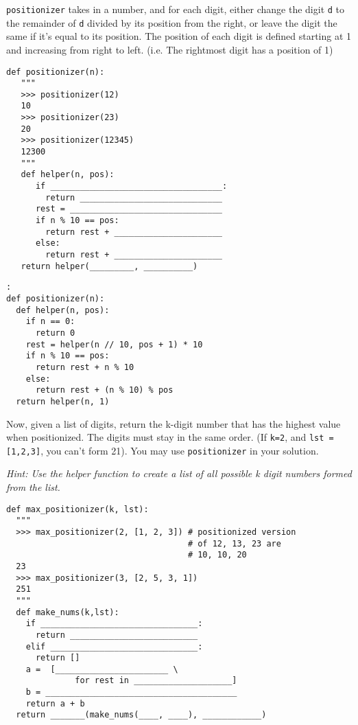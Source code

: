 \begin{blocksection}
\question \lstinline{positionizer} takes in a number, and for each digit, either change the digit \lstinline{d} to the remainder of \lstinline{d} divided by its position from the right, or leave the digit the same if it's equal to its position. The position of each digit is defined starting at 1 and increasing from right to left. (i.e. The rightmost digit has a position of 1)

\begin{lstlisting}
def positionizer(n):
   """
   >>> positionizer(12)
   10
   >>> positionizer(23)
   20
   >>> positionizer(12345)
   12300
   """
   def helper(n, pos):
      if ___________________________________:
        return _____________________________
      rest = _______________________________
      if n % 10 == pos:
        return rest + ______________________
      else:
        return rest + ______________________
   return helper(_________, __________)
\end{lstlisting}
\end{blocksection}

\begin{blocksection}
\begin{solution}
\begin{lstlisting}:
def positionizer(n):
  def helper(n, pos):
    if n == 0:
      return 0
    rest = helper(n // 10, pos + 1) * 10
    if n % 10 == pos:
      return rest + n % 10
    else:
      return rest + (n % 10) % pos
  return helper(n, 1)
\end{lstlisting}
\end{solution}
\end{blocksection}

\begin{blocksection}
Now, given a list of digits, return the k-digit number that has the highest value when positionized. The digits must stay in the same order. (If \lstinline{k=2}, and \lstinline{lst = [1,2,3]}, you can't form 21). You may use \lstinline{positionizer} in your solution.

\textit{Hint: Use the helper function to create a list of all possible k digit numbers formed from the list.}

\begin{lstlisting}
def max_positionizer(k, lst):
  """
  >>> max_positionizer(2, [1, 2, 3]) # positionized version 
                                     # of 12, 13, 23 are 
                                     # 10, 10, 20 
  23
  >>> max_positionizer(3, [2, 5, 3, 1])
  251
  """
  def make_nums(k,lst):
    if ________________________________:
      return __________________________
    elif ______________________________:
      return []
    a =  [_______________________ \
              for rest in ____________________]
    b = _______________________________________
    return a + b
  return _______(make_nums(____, ____), ____________)
\end{lstlisting}
\end{blocksection}

